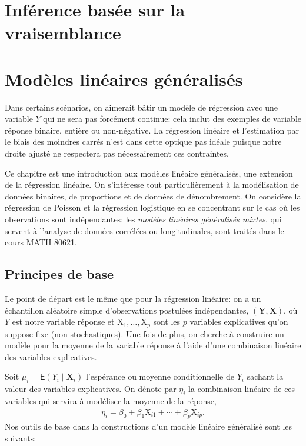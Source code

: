 \documentclass[
  11pt,
  letterpaper,
]{article}
\theoremstyle{definition}
\theoremstyle{definition}
\theoremstyle{definition}
\theoremstyle{definition}
\theoremstyle{remark}
\begin{document}
\hypertarget{vraisemblance}{%
\section{Inférence basée sur la vraisemblance}\label{vraisemblance}}

\hypertarget{modeles-lineaires-generalises}{%
\section{Modèles linéaires généralisés}\label{modeles-lineaires-generalises}}

Dans certains scénarios, on aimerait bâtir un modèle de régression avec une variable \(Y\) qui ne sera pas forcément continue: cela inclut des exemples de variable réponse binaire, entière ou non-négative. La régression linéaire et l'estimation par le biais des moindres carrés n'est dans cette optique pas idéale puisque notre droite ajusté ne respectera pas nécessairement ces contraintes.

Ce chapitre est une introduction aux modèles linéaire généralisés, une extension de la régression linéaire. On s'intéresse tout particulièrement à la modélisation de données binaires, de proportions et de données de dénombrement. On considère la régression de Poisson et la régression logistique en se concentrant sur le cas où les observations sont indépendantes: les
\emph{modèles linéaires généralisés mixtes}, qui servent à l'analyse de données corrélées ou longitudinales, sont traités dans le cours MATH 80621.

\hypertarget{principes-de-base}{%
\subsection{Principes de base}\label{principes-de-base}}

Le point de départ est le même que pour la régression linéaire: on a un échantillon
aléatoire simple d'observations postulées indépendantes,
\((\boldsymbol{Y}, \mathbf{X})\), où \(Y\) est notre variable réponse et
\(\mathrm{X}_1, \ldots, \mathrm{X}_p\) sont les \(p\) variables explicatives qu'on suppose
fixe (non-stochastiques). Une fois de plus, on cherche à
construire un modèle pour la moyenne de la variable réponse à l'aide d'une combinaison linéaire des variables explicatives.

Soit \(\mu_i=\mathsf{E}(Y_i \mid \mathbf{X}_i)\) l'espérance ou moyenne conditionnelle de
\(Y_i\) sachant la valeur des variables explicatives. On dénote par \(\eta_i\) la combinaison linéaire
de ces variables qui servira à modéliser la moyenne de la réponse,
\begin{align*}
\eta_i=\beta_0 + \beta_1 \mathrm{X}_{i1} + \cdots + \beta_p \mathrm{X}_{ip}.
\end{align*}
Nos outils de base dans la constructions d'un modèle linéaire généralisé sont les suivants:
\end{document}
